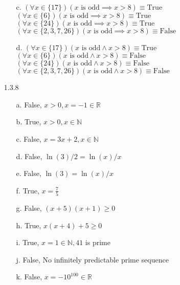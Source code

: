 \documentclass[11pt]{amsart}
\theoremstyle{definition}
\begin{document}
\begin{itemize}
\begin{itemize}
    \item[c.] $(\forall x\in\{17\})(x\text{ is odd}\implies x>8)\equiv\text{True}$ \\
    $(\forall x\in\{6\})(x\text{ is odd}\implies x>8)\equiv\text{True}$ \\
    $(\forall x\in\{24\})(x\text{ is odd}\implies x>8)\equiv\text{True}$ \\
    $(\forall x\in\{2,3,7,26\})(x\text{ is odd}\implies x>8)\equiv\text{False}$

    \item[d.] $(\forall x\in\{17\})(x\text{ is odd}\land  x>8)\equiv\text{True}$ \\
    $(\forall x\in\{6\})(x\text{ is odd}\land  x>8)\equiv\text{False}$ \\
    $(\forall x\in\{24\})(x\text{ is odd}\land  x>8)\equiv\text{False}$ \\
    $(\forall x\in\{2,3,7,26\})(x\text{ is odd}\land  x>8)\equiv\text{False}$
    
\end{itemize}

\item[1.3.8]
\begin{itemize}
    \item[a.] False, $x>0,x=-1\in\mathbb{R}$

    \item[b.] True,  $x>0,x\in\mathbb{N}$

    \item[c.] False, $x=3x+2,x\in\mathbb{N}$

    \item[d.] False, $\ln(3)/2=\ln(x)/x$

    \item[e.] False, $\ln(3)=\ln(x)/x$

    \item[f.] True,  $x=\frac75$

    \item[g.] False, $(x+5)(x+1)\ge 0$

    \item[h.] True,  $x(x+4)+5\ge 0$

    \item[i.] True,  $x=1\in\mathbb{N},41$ is prime

    \item[j.] False, No infinitely predictable prime sequence
    
    \item[k.] False, $x=-10^{100}\in\mathbb{R}$
    

\end{itemize}
\end{itemize}
\end{document}
